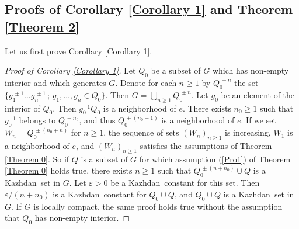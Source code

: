 \documentclass[11pt,english,a4paper]{smfart}
\numberwithin{equation}{section}
\theoremstyle{definition}
\begin{document}
 \subsection{Proofs 
of Corollary \ref{Corollary 1} and Theorem \ref{Theorem 2}} \label{Section 
7.2}
Let us first prove Corollary 
\ref{Corollary 1}.
\begin{proof}[Proof of Corollary \ref{Corollary 1}]
Let ${Q}_{0}$ 
be a subset of $G$ which has non-empty interior and which generates $G$.
Denote for each ${n\ge 1}$ by ${Q}_{0}^{\,\pm n}$ the set $\{g_{1}^{\,\pm 1}
\dots g_{n}^{\,\pm 1}\,;\, g_{1},\dots,g_{n}\in{Q}_{0}\}$. Then 
$G=\bigcup_{n\ge 1}{Q}_{0}^{\,\pm n}$. Let $g_{0}$ be an element of the 
interior of 
 ${Q}_{0}$. Then $g_{0}^{-1}{Q}_{0}$ is a neighborhood of $e$. There 
exists $n_{0}\ge 1$ such that $g_{0}^{-1}$ belongs to 
${Q}_{0}^{\,\pm n_{0}}$, 
and thus ${Q}_{0}^{\,\pm(n_{0}+1)}$ is a neighborhood of $e$. If we set
$W_{n}={Q}_{0}^{\,\pm(n_{0}+n)}$ for ${n\ge 1}$, the sequence of sets 
$(W_{n})_{n\ge 1}$ is increasing, $W_{1}$ is a neighborhood of $e$, and $(W_{n})_{n\ge 1}$
satisfies the assumptions of Theorem \ref{Theorem 0}. So if ${Q}$ is a 
subset of $G$ for which assumption (\ref{Pro1}) of Theorem \ref{Theorem 0} 
holds true, there exists 
$n\ge 1$ such that ${Q}_{0}^{\,\pm(n+n_{0})}\cup Q$ is a {Kazhdan}\ set in $G$. 
Let $\varepsilon >0$ be a {Kazhdan}\ constant for this set. Then $\varepsilon 
/(n+n_{0})$ is a {Kazhdan}\ constant for ${Q}_{0}\cup{Q}$,
and ${Q}_{0}\cup {Q}$ is a {Kazhdan}\ set in 
$G$. If $G$ is locally compact, the same proof 
holds true without the assumption that ${Q}_{0}$ has non-empty interior.
\end{proof}
\end{document}
